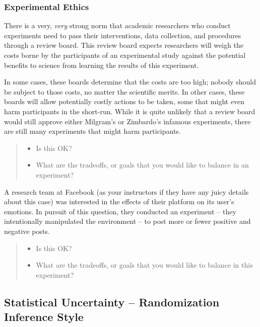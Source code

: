 \documentclass[
]{article}
\providecommand{\tightlist}{%
  \setlength{\itemsep}{0pt}\setlength{\parskip}{0pt}}
\theoremstyle{definition}
\theoremstyle{definition}
\theoremstyle{definition}
\theoremstyle{definition}
\theoremstyle{remark}
\begin{document}
\subsubsection{Experimental Ethics}\label{experimental-ethics}

There is a very, \emph{very} strong norm that academic researchers who conduct experiments need to pass their interventions, data collection, and procedures through a review board. This review board expects researchers will weigh the costs borne by the participants of an experimental study against the potential benefits to science from learning the results of this experiment.

In some cases, these boards determine that the costs are too high; nobody should be subject to those costs, no matter the scientific merits. In other cases, these boards will allow potentially costly actions to be taken, some that might even harm participants in the short-run. While it is quite unlikely that a review board would still approve either Milgram's or Zimbardo's infamous experiments, there are still many experiments that might harm participants.

\begin{quote}
\begin{itemize}
\tightlist
\item
  Is this OK?
\item
  What are the tradeoffs, or goals that you would like to balance in an experiment?
\end{itemize}
\end{quote}

A research team at Facebook (as your instructors if they have any juicy details about this case) was interested in the effects of their platform on its user's emotions. In pursuit of this question, they conducted an experiment -- they intentionally manipulated the environment -- to post more or fewer positive and negative posts.

\begin{quote}
\begin{itemize}
\tightlist
\item
  Is this OK?
\item
  What are the tradeoffs, or goals that you would like to balance in this experiment?
\end{itemize}
\end{quote}

\subsection{Statistical Uncertainty -- Randomization Inference Style}\label{statistical-uncertainty-randomization-inference-style}
\end{document}
